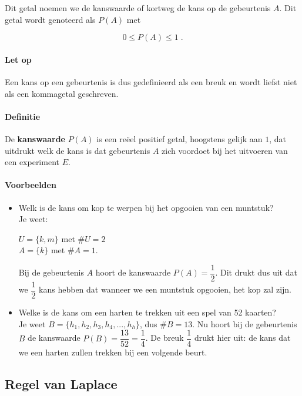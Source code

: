 \documentclass[12pt,a4paper,twoside]{article}
\begin{document}
Dit getal noemen we de kanswaarde of kortweg de kans op de gebeurtenis $A$. Dit getal wordt genoteerd als $P(A)$ met\\
\begin{mdframed}
$$0 \leq P(A) \leq 1\;.$$
\end{mdframed}

\paragraph*{Let op} Een kans op een gebeurtenis is dus gedefinieerd als een breuk en wordt liefst niet als een kommagetal geschreven.

\paragraph*{Definitie} De {\bf kanswaarde} $P(A)$ is een reëel positief getal, hoogstens gelijk aan $1$, dat uitdrukt welk de kans is dat gebeurtenis $A$ zich voordoet bij het uitvoeren van een experiment $E$.

\paragraph*{Voorbeelden}

\begin{itemize}
  \item Welk is de kans om kop te werpen bij het opgooien van een muntstuk?\\
  Je weet:
  \begin{minipage}[t]{\textwidth}
    $U =\{k, m\}$ met $\#U = 2$\\
    $A = \{k\}$ met $\#A = 1$.
  \end{minipage}
  Bij de gebeurtenis $A$ hoort de kanswaarde $P(A) =\dfrac{1}{2}$. Dit drukt dus uit dat we $\dfrac{1}{2}$ kans hebben dat wanneer we een muntstuk opgooien, het kop zal zijn.
  \item Welke is de kans om een harten te trekken uit een spel van 52 kaarten?\\
  Je weet $B = \{h_1, h_2 , h_3 , h_4 , ..., h_h\}$, dus $\#B=13$.
  Nu hoort bij de gebeurtenis $B$ de kanswaarde $P(B)=\dfrac{13}{52}=\dfrac{1}{4}$. De breuk $\dfrac{1}{4}$ drukt hier uit: de kans dat we een harten zullen trekken bij een volgende beurt.
\end{itemize}

\subsection{Regel van Laplace}
\end{document}
